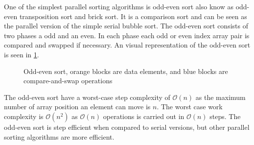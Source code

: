 One of the simplest parallel sorting algorithms is odd-even sort also know as odd-even transposition sort and brick sort. It is a comparison sort and can be seen as the parallel version of the simple serial bubble sort. The odd-even sort consists of two phases a odd and an even. In each phase each odd or even index array pair is compared and swapped if necessary. An visual representation of the odd-even sort is seen in \cref{fig:sort_odd_even}.

\begin{figure}[ht]
	\centering
	\caption{Odd-even sort, orange blocks are data elements, and blue blocks are compare-and-swap operations}
	\label{fig:sort_odd_even}
\end{figure}  

The odd-even sort have a worst-case step complexity of $\mathcal{O}(n)$ as the maximum number of array position an element can move is $n$. The worst case work complexity is $\mathcal{O}(n^2)$ as $\mathcal{O}(n)$ operations is carried out in $\mathcal{O}(n)$ steps. The odd-even sort is step efficient when compared to serial versions, but other parallel sorting algorithms are more efficient.   